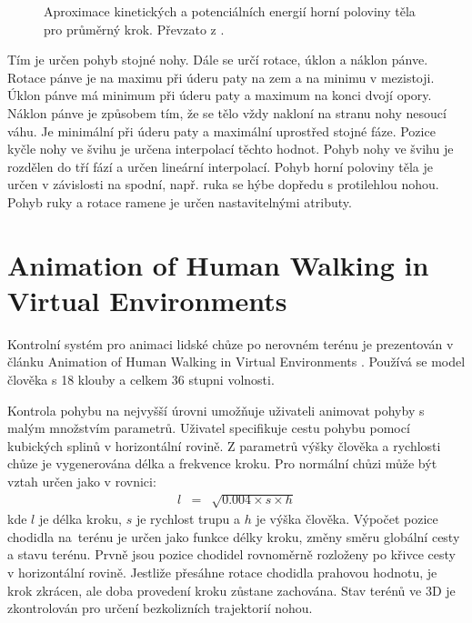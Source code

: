 \begin{figure}[h]
\begin{center}
\caption{Aproximace kinetických a potenciálních energií horní poloviny těla pro průměrný krok. Převzato z \cite{bruderlin}.} \label{bruderlin_img}
\end{center}
\end{figure}

Tím je určen pohyb stojné nohy. Dále se určí rotace, úklon a náklon pánve. Rotace pánve je na maximu při úderu paty na zem a na minimu v mezistoji. Úklon pánve má minimum při úderu paty a maximum na konci dvojí opory. Náklon pánve je způsobem tím, že se tělo vždy nakloní na stranu nohy nesoucí váhu. Je minimální při úderu paty a maximální uprostřed stojné fáze. Pozice kyčle nohy ve švihu je určena interpolací těchto hodnot. Pohyb nohy ve švihu je rozdělen do tří fází a určen lineární interpolací. Pohyb horní poloviny těla je určen v závislosti na spodní, např. ruka se hýbe dopředu s protilehlou nohou. Pohyb ruky a rotace ramene je určen nastavitelnými atributy.

\section{Animation of Human Walking in Virtual Environments}
Kontrolní systém pro animaci lidské chůze po nerovném terénu je prezentován v článku Animation of Human Walking in Virtual Environments \cite{chung}. Používá se model člověka s 18 klouby a celkem 36 stupni volnosti. 

Kontrola pohybu na nejvyšší úrovni umožňuje uživateli animovat pohyby s malým množstvím parametrů. Uživatel specifikuje cestu pohybu pomocí kubických splinů v horizontální rovině. Z parametrů výšky člověka a rychlosti chůze je vygenerována délka a frekvence kroku. Pro normální chůzi může být vztah určen jako v rovnici:
\begin{eqnarray}
l &=& \sqrt{0.004 \times s \times h}\label{r.step_length}
\end{eqnarray}
kde $l$ je délka kroku, $s$ je rychlost trupu a $h$ je výška člověka.
Výpočet pozice chodidla na~terénu je určen jako funkce délky kroku, změny směru globální cesty a stavu terénu. Prvně jsou pozice chodidel rovnoměrně rozloženy po křivce cesty v horizontální rovině. Jestliže přesáhne rotace chodidla prahovou hodnotu, je krok zkrácen, ale doba provedení kroku zůstane zachována. Stav terénů ve 3D je zkontrolován pro určení bezkolizních trajektorií nohou. 

